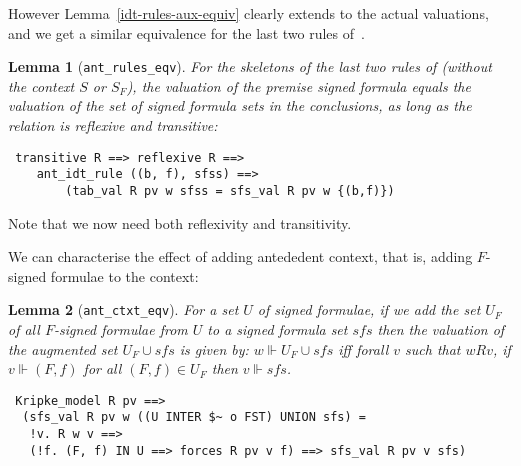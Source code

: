 \documentclass[a4paper]{article}
\newtheorem{lemma}{Lemma}
\begin{document}
However Lemma~\ref{idt-rules-aux-equiv} clearly extends to the
actual valuations, and we get a similar equivalence
for the last two rules of~\cite[Figure~1.6]{fitting-dual-tableau}.

\begin{lemma}[\texttt{ant\_rules\_eqv}] \label{ant-rules-eqv} For the
  skeletons of the last two rules of \cite[Figure~1.6]{fitting-dual-tableau}
  (without the context $S$ or $S_F$),
  the valuation of the premise signed formula equals the
  valuation of the set of signed formula sets in the conclusions,
  as long as the relation is reflexive
  and transitive:
\end{lemma}
\begin{verbatim}
 transitive R ==> reflexive R ==> 
    ant_idt_rule ((b, f), sfss) ==>
        (tab_val R pv w sfss = sfs_val R pv w {(b,f)})
\end{verbatim}

Note that we now need both reflexivity and transitivity.

We can characterise the effect of adding antededent context, that is,
adding $F$-signed formulae to the context:

\begin{lemma}[\texttt{ant\_ctxt\_eqv}] \label{ant-ctxt-eqv}
  For a set $U$ of signed formulae, if
  we add the set $U_F$ of all $F$-signed formulae from $U$
  to a signed formula set $\textit{sfs}$
  then the valuation of the augmented set
  $U_F \cup \textit{sfs}$ is given by:
  $w \Vdash U_F \cup \textit{sfs}$ iff
  forall $v$ such that $wRv$,
  if $v \Vdash (F,f)$ for all $(F,f) \in U_F$
  then $v \Vdash \textit{sfs}$.
\end{lemma}
\begin{verbatim}
 Kripke_model R pv ==> 
  (sfs_val R pv w ((U INTER $~ o FST) UNION sfs) =
   !v. R w v ==> 
   (!f. (F, f) IN U ==> forces R pv v f) ==> sfs_val R pv v sfs)
\end{verbatim}

\end{document}
